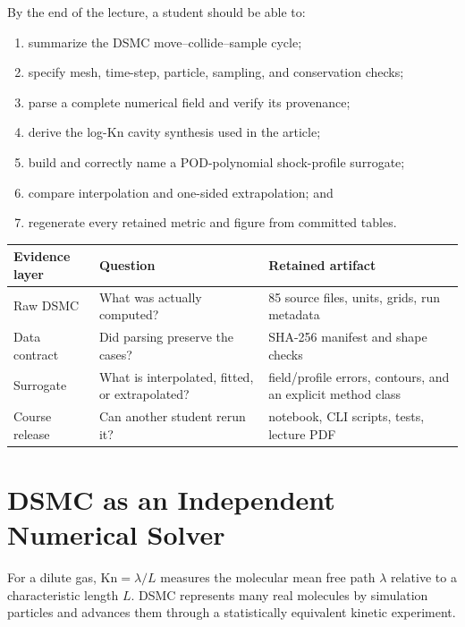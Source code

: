 \documentclass[11pt]{article}
\newcommand{\Kn}{\mathrm{Kn}}
\begin{document}
\begin{learningbox}
By the end of the lecture, a student should be able to:
\begin{enumerate}
\item summarize the DSMC move--collide--sample cycle;
\item specify mesh, time-step, particle, sampling, and conservation checks;
\item parse a complete numerical field and verify its provenance;
\item derive the log-$\Kn$ cavity synthesis used in the article;
\item build and correctly name a POD-polynomial shock-profile surrogate;
\item compare interpolation and one-sided extrapolation; and
\item regenerate every retained metric and figure from committed tables.
\end{enumerate}
\end{learningbox}

\begin{center}
\begin{tabular}{p{}p{}p{}}
\toprule
Evidence layer & Question & Retained artifact \\
\midrule
Raw DSMC & What was actually computed? & 85 source files, units, grids, run metadata \\
Data contract & Did parsing preserve the cases? & SHA-256 manifest and shape checks \\
Surrogate & What is interpolated, fitted, or extrapolated? & field/profile errors, contours, and an explicit method class \\
Course release & Can another student rerun it? & notebook, CLI scripts, tests, lecture PDF \\
\bottomrule
\end{tabular}
\end{center}

\clearpage
\section{DSMC as an Independent Numerical Solver}
For a dilute gas, $\Kn=\lambda/L$ measures the molecular mean free path
$\lambda$ relative to a characteristic length $L$. DSMC represents many real
molecules by simulation particles and advances them through a statistically
equivalent kinetic experiment.
\end{document}
